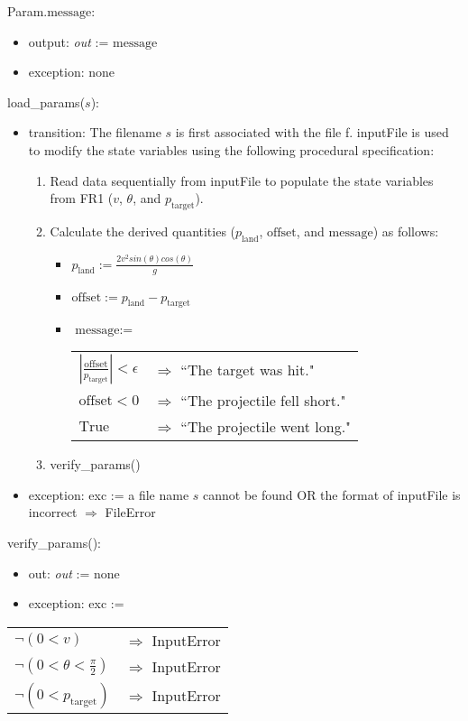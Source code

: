 \documentclass[12pt, titlepage]{article}
\begin{document}
\noindent Param.$\text{message}$:
\begin{itemize}
\item output: \textit{out} := $\text{message}$
\item exception: none
\end{itemize}

\noindent load\_params($s$):
\begin{itemize}
\item transition: The filename $s$ is first associated with the file f. 
{inputFile} is used to modify the state variables using the following procedural 
specification:
\begin{enumerate}
\item Read data sequentially from inputFile to populate the state variables from
  FR1 ($v$, $\theta$, and $p_{\text{target}}$).
\item Calculate the derived quantities ($p_{\text{land}}$, $\text{offset}$, and $
\text{message}$) as follows:
\begin{itemize}
\item $p_{\text{land}} := \frac{2 v^2 sin(\theta) cos(\theta)}{g}$
\item $\text{offset} := p_{\text{land}} - p_{\text{target}} $
\item $\text{message} := $
\begin{longtable*}[l]{l l} 
$|\frac{\text{offset}}{p_{\text{target}}}| < \epsilon$ & $\Rightarrow$ ``The target was hit."\\
$\text{offset} < 0$ & $\Rightarrow$ ``The projectile fell short."\\
$\text{True}$ & $\Rightarrow$ ``The projectile went long."\\
\end{longtable*}
\end{itemize}
\item verify\_params()
\end{enumerate}

\item exception: exc := a file name $s$ cannot be found OR the format of
  inputFile is incorrect $\Rightarrow$  FileError
\end{itemize}

\noindent verify\_params():
\begin{itemize}
\item out: \textit{out} := none
\item exception: exc := 
\end{itemize}
\noindent \begin{longtable*}[l]{l l} 
$\neg (0 < v)$ & $\Rightarrow$ InputError\\
$\neg (0 < \theta < \frac{\pi}{2})$ & $\Rightarrow$ InputError\\
$\neg (0 < p_{\text{target}})$ & $\Rightarrow$ InputError\\
\end{longtable*}
\end{document}
